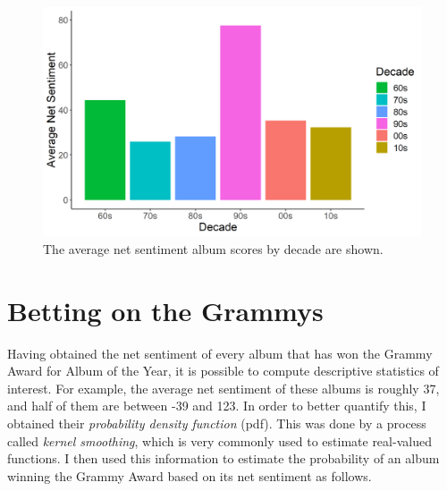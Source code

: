 \documentclass{article}
\begin{document}
\begin{figure}[h]
    \centering
    \includegraphics[scale=0.45]{Plots/graph_decade_mean_sentiment.png}
    \caption{The average net sentiment album scores by decade are shown.}
    \label{fig:decade_sentiment}
\end{figure}


\FloatBarrier



\section*{Betting on the Grammys}


Having obtained the net sentiment of every album that has won the Grammy Award for Album of the Year, it is possible to compute descriptive statistics of interest. For example, the average net sentiment of these albums is roughly 37, and half of them are between -39 and 123. In order to better quantify this, I obtained their \textit{probability density function} (pdf). This was done by a process called \textit{kernel smoothing}, which is very commonly used to estimate real-valued functions. I then used this information to estimate the probability of an album winning the Grammy Award based on its net sentiment as follows. \\


\end{document}
